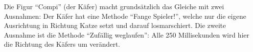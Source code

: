 Die Figur ``Compi'' (der Käfer) macht grundsätzlich das Gleiche mit zwei
Ausnahmen: Der Käfer hat eine Methode ``Fange Spieler!'', welche nur die
eigene Ausrichtung in Richtung Katze setzt und darauf losmarschiert. Die
zweite Ausnahme ist die Methode ``Zufällig weglaufen'': Alle 250
Millisekunden wird hier die Richtung des Käfers um verändert.
